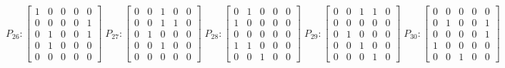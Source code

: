     $$
        P_{26} : \begin{bmatrix}
            1 & 0 & 0 & 0 & 0 \\
            0 & 0 & 0 & 0 & 1 \\
            0 & 1 & 0 & 0 & 1 \\
            0 & 1 & 0 & 0 & 0 \\
            0 & 0 & 0 & 0 & 0
        \end{bmatrix}
        \;
         P_{27} : \begin{bmatrix}
            0 & 0 & 1 & 0 & 0 \\
            0 & 0 & 1 & 1 & 0 \\
            0 & 1 & 0 & 0 & 0 \\
            0 & 0 & 1 & 0 & 0 \\
            0 & 0 & 0 & 0 & 0
        \end{bmatrix}
        \;
        P_{28} : \begin{bmatrix}
            0 & 1 & 0 & 0 & 0 \\
            1 & 0 & 0 & 0 & 0 \\
            0 & 0 & 0 & 0 & 0 \\
            1 & 1 & 0 & 0 & 0 \\
            0 & 0 & 1 & 0 & 0
        \end{bmatrix}
        \;
        P_{29} : \begin{bmatrix}
            0 & 0 & 1 & 1 & 0 \\
            0 & 0 & 0 & 0 & 0 \\
            0 & 1 & 0 & 0 & 0 \\
            0 & 0 & 1 & 0 & 0 \\
            0 & 0 & 0 & 1 & 0
        \end{bmatrix}
        \;
        P_{30} : \begin{bmatrix}
            0 & 0 & 0 & 0 & 0 \\
            0 & 1 & 0 & 0 & 1 \\
            0 & 0 & 0 & 0 & 1 \\
            1 & 0 & 0 & 0 & 0 \\
            0 & 0 & 1 & 0 & 0
        \end{bmatrix}
    $$

